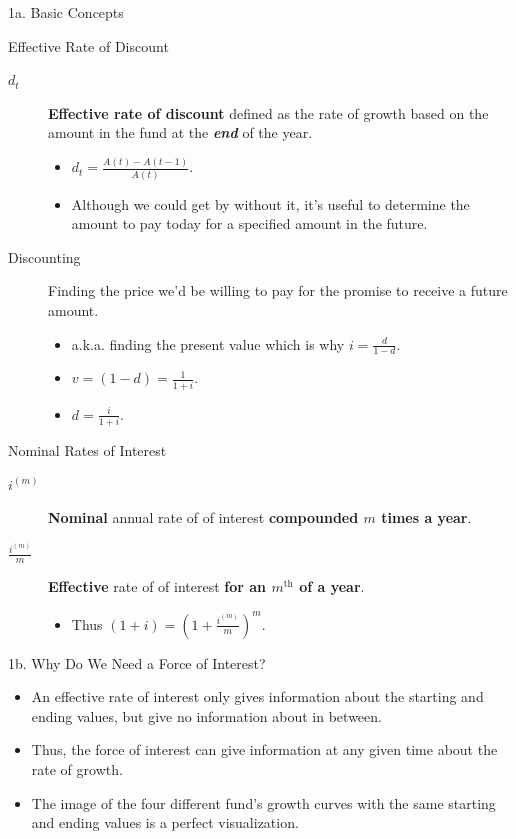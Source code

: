 \begin{CHPT_SUMM_AUTO}[label = {L.-1a}]{1a. Basic Concepts}
\begin{FORMULA_SUMM}{Effective Rate of Discount}
\begin{description}
	\item[$d_{t}$]	\textbf{Effective rate of discount} defined as the rate of growth based on the amount in the fund at the \textbf{\textit{end}} of the year.
		\begin{itemize}[leftmargin = *]
		\item	$d_{t} = \frac{A(t) - A(t - 1)}{A(t)}$.\
		\item	Although we could get by without it, it's useful to determine the amount to pay today for a specified amount in the future.
		\end{itemize}
	\item[Discounting]	Finding the price we'd be willing to pay for the promise to receive a future amount.
		\begin{itemize}[leftmargin = *]
		\item	a.k.a. finding the present value which is why $i = \frac{d}{1 - d}$.
		\item	$v = (1 - d) = \frac{1}{1 + i}$.
		\item	$d = \frac{i}{1 + i}$.
		\end{itemize}
\end{description}
\end{FORMULA_SUMM}

\begin{FORMULA_SUMM}{Nominal Rates of Interest}
\begin{description}
	\item[$i^{(m)}$]	\textbf{Nominal} annual rate of of interest \textbf{compounded $m$ times a year}.
	\item[$\frac{i^{(m)}}{m}$]	\textbf{Effective} rate of of interest \textbf{for an $m^{\text{th}}$ of a year}.
		\begin{itemize}[leftmargin = *]
		\item	Thus $(1 + i) = \left(1 + \frac{i^{(m)}}{m}\right)^{m}$.\
		\end{itemize}
\end{description}
\end{FORMULA_SUMM}
\end{CHPT_SUMM_AUTO}

\begin{CHPT_SUMM_AUTO}[label = {L.-1b}]{1b. Why Do We Need a Force of Interest?}
	\begin{itemize}
		\item	An effective rate of interest only gives information about the starting and ending values, but give no information about in between.
		\item	Thus, the force of interest can give information at any given time about the rate of growth.
		\item	The image of the four different fund's growth curves with the same starting and ending values is a perfect visualization.
	\end{itemize}
\end{CHPT_SUMM_AUTO}


